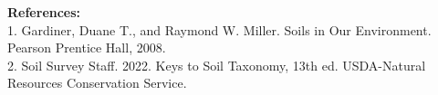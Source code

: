 \documentclass[12pt]{exam}
\begin{document}
\begin{description}[labelsep=1.80em, align=right]
\textbf{References:}\\
1. Gardiner, Duane T., and Raymond W. Miller. Soils in Our Environment. Pearson Prentice Hall, 2008.\\
2. Soil Survey Staff. 2022. Keys to Soil Taxonomy, 13th ed. USDA-Natural Resources Conservation Service.
\end{description}
\end{document}
